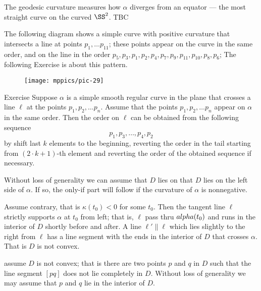 The geodesic curvature measures how $\alpha$ diverges from an equator --- the most straight curve on the curved $\SS^2$.
TBC














The following diagram shows a simple curve with positive curvature that intersects a line at points $p_1,\dots p_11$; these points appear on the curve in the same order, and on the line  in the order $p_5,p_3,p_1,p_2,p_4,p_7,p_9,p_{11},p_{10},p_8,p_6$; 
The following Exercise is about this pattern.

\begin{figure}[h!]
\vskip-0mm
\centering
\texttt{[image: mppics/pic-29]}
\vskip0mm
\end{figure}

\begin{thm}{Exercise}
Suppose $\alpha$ is a simple smooth regular curve in the plane that crosses a line $\ell$ at the points $p_1,p_2,\dots p_n$.
Assume that the points $p_1,p_2,\dots p_n$ appear on $\alpha$ in the same order.
Then the order on $\ell$ can be obtained from the following sequence 
\[p_1,p_3,\dots,p_4 ,p_2\]
by shift last $k$ elements to the beginning, reverting the order in the tail starting from $(2\cdot k+1)$-th element and reverting the order of the obtained sequence if necessary.
\end{thm}





Without loss of generality we can assume that $D$ lies on that $D$ lies on the left side of $\alpha$.
If so,
the only-if part will follow if the curvature of $\alpha$ is nonnegative.

Assume contrary, that is $\kappa(t_0)<0$ for some $t_0$.
Then the tangent line $\ell$ strictly supports $\alpha$ at $t_0$ from left;
that is, $\ell$ pass thru $\\alpha(t_0)$ and runs in the interior of $D$ shortly before and after.
A line $\ell'\parallel \ell$ which lies slightly to the right from $\ell$ has a line segment with the ends in the interior of $D$ that crosses $\alpha$.
That is $D$ is not convex.

 assume $D$ is not convex; that is there are two points $p$ and $q$ in $D$ such that the line segment $[pq]$ does not lie completely in $D$.
Without loss of generality we may assume that $p$ and $q$ lie in the interior of $D$.

